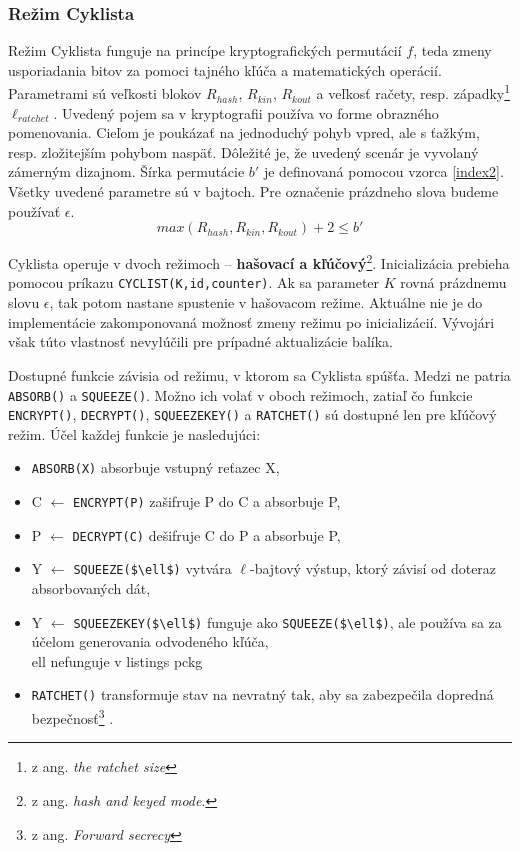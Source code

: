 \subsubsection{Režim Cyklista}\label{cyklista}
Režim Cyklista funguje na princípe kryptografických permutácií $f$, teda zmeny usporiadania bitov za pomoci tajného kľúča a matematických operácií. Parametrami sú veľkosti blokov $R_{hash}$, $R_{kin}$, $R_{kout}$ a veľkosť račety, resp. západky\footnote{z ang. \textit{the ratchet size}} \cite{ratchet} $\ell_{ratchet}$. Uvedený pojem sa v kryptografii používa vo forme obrazného pomenovania. Cieľom je poukázať na jednoduchý pohyb vpred, ale s ťažkým, resp. zložitejším pohybom naspäť. Dôležité je, že uvedený scenár je vyvolaný zámerným dizajnom. Šírka permutácie $b'$ je definovaná pomocou vzorca \ref{index2}. Všetky uvedené parametre sú v bajtoch. Pre označenie prázdneho slova budeme používať $\epsilon$.
\begin{equation}\label{index2}
	max(R_{hash}, R_{kin}, R_{kout}) + 2 \leq b'
\end{equation} 

Cyklista operuje v dvoch režimoch -- \textbf{hašovací a kľúčový}\footnote{z ang. \textit{hash and keyed mode}.}. 
Inicializácia prebieha pomocou príkazu \lstinline|CYCLIST(K,id,counter)|. Ak sa parameter $K$ rovná prázdnemu slovu $\epsilon$, tak potom nastane spustenie v hašovacom režime. Aktuálne nie je do implementácie zakomponovaná možnosť zmeny režimu po inicializácií. Vývojári však túto vlastnosť nevylúčili pre prípadné aktualizácie balíka.  


Dostupné funkcie závisia od režimu, v ktorom sa  Cyklista spúšťa. Medzi ne patria \lstinline|ABSORB()| a \lstinline|SQUEEZE()|. Možno ich volať v oboch režimoch, zatiaľ čo funkcie \lstinline|ENCRYPT()|, \lstinline|DECRYPT()|, \lstinline|SQUEEZEKEY()| a \lstinline|RATCHET()| sú dostupné len pre kľúčový režim. Účel každej funkcie je nasledujúci:
\begin{itemize}
	\item \lstinline|ABSORB(X)| absorbuje vstupný reťazec X,
	\item C $\gets$ \lstinline|ENCRYPT(P)| zašifruje P do C a absorbuje P,
	\item P $\gets$ \lstinline|DECRYPT(C)| dešifruje C do P a absorbuje P,
	\item Y $\gets$	\lstinline|SQUEEZE($\ell$)|  vytvára $\ell$-bajtový výstup, ktorý závisí od doteraz absorbovaných dát,
	\item Y $\gets$	\lstinline|SQUEEZEKEY($\ell$)| funguje ako \lstinline|SQUEEZE($\ell$)|, ale používa sa za účelom generovania odvodeného kľúča, 		\\ell nefunguje v listings pckg
	\item \lstinline|RATCHET()| transformuje stav na nevratný tak, aby sa zabezpečila dopredná bezpečnosť\footnote{z ang. \textit{Forward secrecy}} \cite{fsec}. 
\end{itemize}

